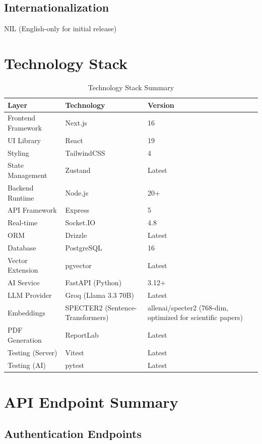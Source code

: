 \documentclass[11pt,a4paper]{article}
\begin{document}
\subsection{Internationalization}

NIL (English-only for initial release)

\newpage
\appendix

\section{Technology Stack}

\begin{table}[H]
\centering
\begin{tabular}{p{4cm}p{5cm}p{3cm}}
\toprule
\textbf{Layer} & \textbf{Technology} & \textbf{Version} \\
\midrule
Frontend Framework & Next.js & 16 \\
UI Library & React & 19 \\
Styling & TailwindCSS & 4 \\
State Management & Zustand & Latest \\
Backend Runtime & Node.js & 20+ \\
API Framework & Express & 5 \\
Real-time & Socket.IO & 4.8 \\
ORM & Drizzle & Latest \\
Database & PostgreSQL & 16 \\
Vector Extension & pgvector & Latest \\
AI Service & FastAPI (Python) & 3.12+ \\
LLM Provider & Groq (Llama 3.3 70B) & Latest \\
Embeddings & SPECTER2 (Sentence-Transformers) & allenai/specter2 (768-dim, optimized for scientific papers) \\
PDF Generation & ReportLab & Latest \\
Testing (Server) & Vitest & Latest \\
Testing (AI) & pytest & Latest \\
\bottomrule
\end{tabular}
\caption{Technology Stack Summary}
\end{table}

\section{API Endpoint Summary}

\subsection{Authentication Endpoints}
\end{document}
